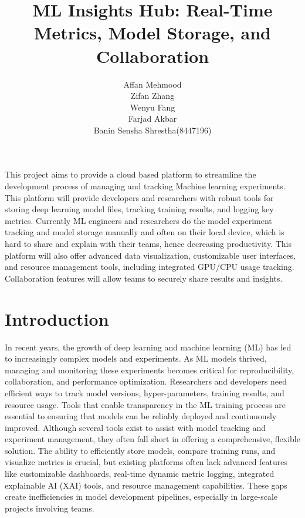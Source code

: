 \documentclass[12pt]{article}
\begin{document}
\title{ML Insights Hub: Real-Time Metrics, Model Storage, and Collaboration}


\author{
Affan Mehmood\\
Zifan Zhang\\
Wenyu Fang\\
Farjad Akbar\\
Banin Sensha Shrestha(8447196)\\
}




\maketitle {}

\abstract This project aims to provide a cloud based platform to streamline the development process of managing and tracking Machine learning experiments. This platform will provide developers and researchers with robust tools for storing deep learning model files, tracking training results, and logging key metrics. Currently ML engineers and researchers do the model experiment tracking and model storage manually and often on their local device, which is hard to share and explain with their teams, hence decreasing productivity. This platform will also offer advanced data visualization, customizable user interfaces, and resource management tools, including integrated GPU/CPU usage tracking. Collaboration features will allow teams to securely share results and insights.

\section{Introduction}

In recent years, the growth of deep learning and machine learning (ML) has led to increasingly complex models and experiments. As ML models thrived, managing and monitoring these experiments becomes critical for reproducibility, collaboration, and performance optimization. Researchers and developers need efficient ways to track model versions, hyper-parameters, training results, and resource usage. Tools that enable transparency in the ML training process are essential to ensuring that models can be reliably deployed and continuously improved. 
Although several tools exist to assist with model tracking and experiment management, they often fall short in offering a comprehensive, flexible solution. The ability to efficiently store models, compare training runs, and visualize metrics is crucial, but existing platforms often lack advanced features like customizable dashboards, real-time dynamic metric logging, integrated explainable AI (XAI) tools, and resource management capabilities. These gaps create inefficiencies in model development pipelines, especially in large-scale projects involving teams.
\end{document}
